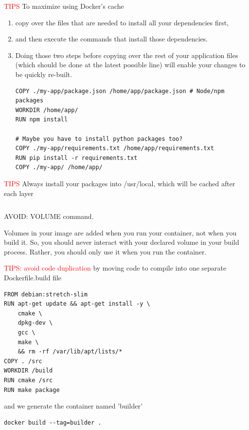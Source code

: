 \textcolor{red}{TIPS} To maximize using Docker's cache
\begin{enumerate}
  \item   copy over the files that are needed to install all your dependencies first, 
  
  
  \item and then execute the commands that install those dependencies. 
  
  
  \item Doing those two steps before copying over the rest of your application
  files (which should be done at the latest possible line) will enable your
  changes to be quickly re-built.
  
\begin{verbatim}
COPY ./my-app/package.json /home/app/package.json # Node/npm packages
WORKDIR /home/app/
RUN npm install

# Maybe you have to install python packages too?
COPY ./my-app/requirements.txt /home/app/requirements.txt
RUN pip install -r requirements.txt
COPY ./my-app/ /home/app/
\end{verbatim}
\end{enumerate}


\textcolor{red}{TIPS} Always install your packages into /usr/local, which will
be cached after each layer

\begin{verbatim}

\end{verbatim} 

\begin{mdframed}
AVOID: VOLUME command.

Volumes in your image are added when you run your container, not when you build
it. So, you should never interact with your declared volume in your build
process. Rather, you should only use it when you run the container.
\end{mdframed}

\textcolor{red}{TIPS: avoid code duplication} by moving code to compile into one separate Dockerfile.build file
\begin{verbatim}
FROM debian:stretch-slim
RUN apt-get update && apt-get install -y \
    cmake \
    dpkg-dev \
    gcc \
    make \
    && rm -rf /var/lib/apt/lists/*
COPY . /src
WORKDIR /build
RUN cmake /src
RUN make package
\end{verbatim}
and we generate the container named 'builder'
\begin{verbatim}
docker build --tag=builder .
\end{verbatim}

